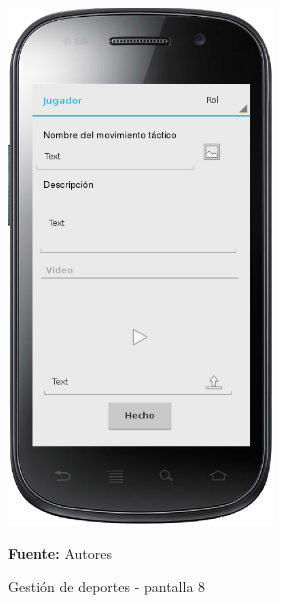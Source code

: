 \begin{figure}[!htb]
  \begin{center}
    \includegraphics[width=7cm]{./imagenes/UI/Deportes/gestion_deportes_8.png}
    \caption{Gestión de deportes - pantalla 8}
    \label{fig:gestion_deportes_8}
    \textbf{Fuente:}  Autores
  \end{center}
\end{figure}

